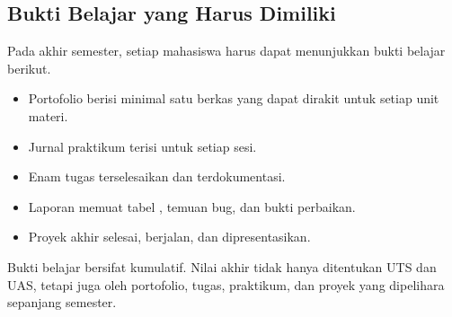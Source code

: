 \subsection{Bukti Belajar yang Harus Dimiliki}

Pada akhir semester, setiap mahasiswa harus dapat menunjukkan bukti
belajar berikut.

\begin{checklistbox}
\vspace{1.1em}
\begin{itemize}
    \item[\checkbox] Portofolio berisi minimal satu berkas
           yang dapat dirakit untuk setiap unit materi.
    \item[\checkbox] Jurnal praktikum terisi untuk setiap sesi.
    \item[\checkbox] Enam tugas terselesaikan dan terdokumentasi.
    \item[\checkbox] Laporan  memuat tabel
          , temuan bug, dan bukti perbaikan.
    \item[\checkbox] Proyek akhir selesai, berjalan, dan
          dipresentasikan.
\end{itemize}
\end{checklistbox}

\begin{infobox}
\vspace{1.1em}
Bukti belajar bersifat kumulatif. Nilai akhir tidak hanya ditentukan
UTS dan UAS, tetapi juga oleh portofolio, tugas, praktikum, dan
proyek yang dipelihara sepanjang semester.
\end{infobox}
